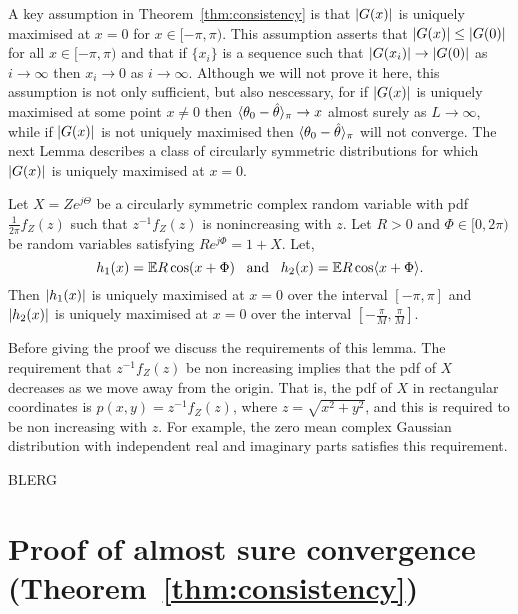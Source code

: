 \documentclass[journal]{IEEEtran}
\begin{document}
A key assumption in Theorem~\ref{thm:consistency} is that ${\left\vert G(x) \right\vert}$ is uniquely maximised at $x = 0$ for $x \in [-\pi, \pi)$.  This assumption asserts that ${\left\vert G(x) \right\vert} \leq {\left\vert G(0) \right\vert}$ for all $x \in [-\pi, \pi)$ and that if $\{x_i\}$ is a sequence such that ${\left\vert G(x_i) \right\vert} \rightarrow {\vert G(0) \vert}$ as $i \rightarrow \infty$ then $x_i \rightarrow 0$ as $i \rightarrow \infty$.  Although we will not prove it here, this assumption is not only sufficient, but also nescessary, for if ${\left\vert G(x) \right\vert}$ is uniquely maximised at some point $x \neq 0$ then $\langle \theta_0 - \hat{\theta} \rangle_\pi \rightarrow x$ almost surely as $L\rightarrow\infty$, while if ${\left\vert G(x) \right\vert}$ is not uniquely maximised then $\langle \theta_0 - \hat{\theta} \rangle_\pi$ will not converge.  The next Lemma describes a class of circularly symmetric distributions for which ${\left\vert G(x) \right\vert}$ is uniquely maximised at $x = 0$.

\begin{lemma}
Let $X = Z e^{j\Theta}$ be a circularly symmetric complex random variable with pdf $\tfrac{1}{2\pi}f_Z(z)$ such that $z^{-1} f_Z(z)$ is nonincreasing with $z$.  Let $R > 0$ and $\Phi \in [0, 2\pi)$ be random variables satisfying $R e^{j\Phi} = 1 + X$.  Let,
\[
h_1(x) = {\mathbb E} R \cos(x + \Phi) \;\;\; \text{and} \;\;\; h_2(x) =  {\mathbb E} R \cos\langle  x + \Phi \rangle.
\]
Then ${\left\vert h_1(x) \right\vert}$ is uniquely maximised at $x=0$ over the interval $[-\pi,\pi]$ and ${\left\vert h_2(x) \right\vert}$ is uniquely maximised at $x = 0$ over the interval $[-\tfrac{\pi}{M},\tfrac{\pi}{M}]$.
\end{lemma}
Before giving the proof we discuss the requirements of this lemma.  The requirement that $z^{-1}f_{Z}(z)$ be non increasing implies that the pdf of $X$ decreases as we move away from the origin. That is, the pdf of $X$ in rectangular coordinates is $p(x,y) = z^{-1}f_{Z}(z)$, where $z = \sqrt{x^2 + y^2}$, and this is required to be non increasing with $z$.  For example, the zero mean complex Gaussian distribution with independent real and imaginary parts satisfies this requirement.
\begin{IEEEproof}
BLERG
\end{IEEEproof}


\section{Proof of almost sure convergence (Theorem~\ref{thm:consistency}) } \label{sec:proof-almost-sure}
\end{document}
